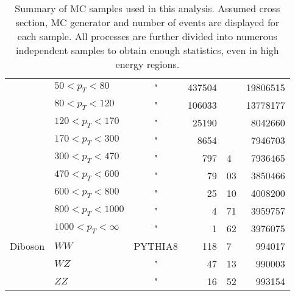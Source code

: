 \begin{table}
\begin{tabular}{l l c r@{.}l r }
		                & $50 < p_T < 80$ & " & 437504 & & 19806515 \\
		                & $80 < p_T < 120$ & " & 106033 & & 13778177 \\
		                & $120 < p_T < 170$ & " & 25190 & & 8042660 \\
		                & $170 < p_T < 300$ & " & 8654 & & 7946703 \\
		                & $300 < p_T < 470$ & " & 797 & 4 & 7936465 \\
		                & $470 < p_T < 600$ & " & 79 & 03 & 3850466 \\
		                & $600 < p_T < 800$ & " & 25 & 10 & 4008200 \\
		                & $800 < p_T < 1000$ & " & 4 & 71 & 3959757 \\
		                & $1000 < p_T < \infty$ & " & 1 & 62 &  3976075 \\
		\hline
	 	Diboson & $WW$ & PYTHIA8 & 118 & 7 & 994017 \\
	 			& $WZ$ & " & 47 & 13 & 990003 \\
	 	        & $ZZ$ & " & 16 & 52 & 993154 \\
	 	 \hline
	 \end{tabular}
	\caption{Summary of MC samples used in this analysis. Assumed cross section, MC generator and number of events are displayed for each sample. All processes are further divided into numerous independent samples to obtain enough statistics, even in high energy regions.}
	\label{MC_Tab}	
	\end{table}
